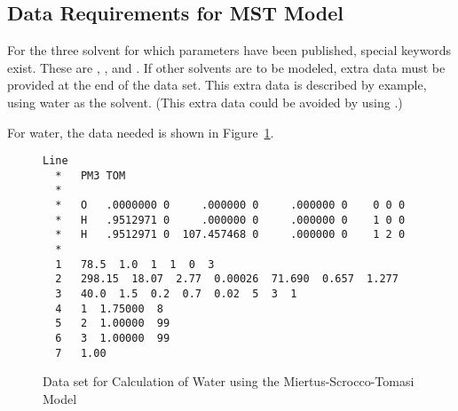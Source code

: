 \subsection{Data Requirements for MST Model}\label{mstdata}
For the three solvent for which parameters have been published, special
keywords exist.  These are , , and . If other
solvents are to be modeled, extra data must be provided at  the end of the data
set.  This extra data is described by example, using water as the solvent.
(This extra data could be avoided by using .)

For water, the data needed is shown in Figure~\ref{tomdata}.
\begin{figure}
\begin{makeimage}
\end{makeimage}
\begin{verbatim}
Line
  *   PM3 TOM 
  *
  *   O   .0000000 0     .000000 0     .000000 0    0 0 0
  *   H   .9512971 0     .000000 0     .000000 0    1 0 0
  *   H   .9512971 0  107.457468 0     .000000 0    1 2 0
  *
  1   78.5  1.0  1  1  0  3
  2   298.15  18.07  2.77  0.00026  71.690  0.657  1.277
  3   40.0  1.5  0.2  0.7  0.02  5  3  1
  4   1  1.75000  8
  5   2  1.00000  99
  6   3  1.00000  99
  7   1.00
\end{verbatim}
\caption{\label{tomdata}Data set for Calculation of Water using the Miertus-Scrocco-Tomasi Model}
\end{figure}


